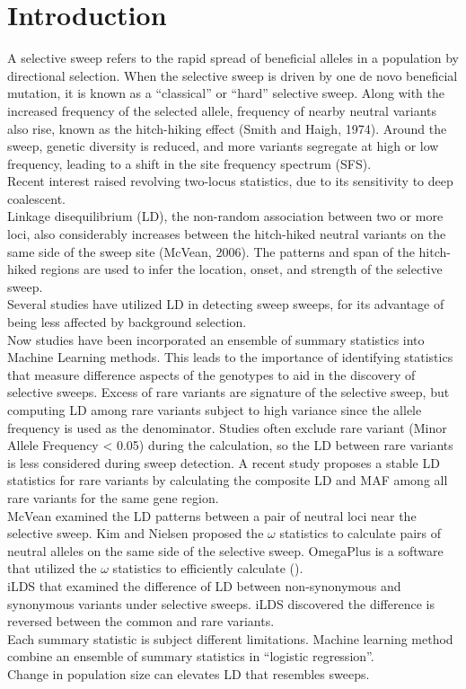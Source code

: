 \documentclass[12pt]{article}
\begin{document}
\section{Introduction}
A selective sweep refers to the rapid spread of beneficial alleles in a population by directional selection. When the selective sweep is driven by one de novo beneficial mutation, it is known as a “classical” or “hard” selective sweep. Along with the increased frequency of the selected allele, frequency of nearby neutral variants also rise, known as the hitch-hiking effect (Smith and Haigh, 1974). Around the sweep, genetic diversity is reduced, and more variants segregate at high or low frequency, leading to a shift in the site frequency spectrum (SFS). 
\\
Recent interest raised revolving two-locus statistics, due to its sensitivity to deep coalescent. 
\\
Linkage disequilibrium (LD), the non-random association between two or more loci, also considerably increases between the hitch-hiked neutral variants on the same side of the sweep site (McVean, 2006). The patterns and span of the hitch-hiked regions are used to infer the location, onset, and strength of the selective sweep. 
\\
Several studies have utilized LD in detecting sweep sweeps, for its advantage of being less affected by background selection.
\\
Now studies have been incorporated an ensemble of summary statistics into Machine Learning methods. This leads to the importance of identifying statistics that measure difference aspects of the genotypes to aid in the discovery of selective sweeps.
Excess of rare variants are signature of the selective sweep, but computing LD among rare variants subject to high variance since the allele frequency is used as the denominator. Studies often exclude rare variant (Minor Allele Frequency < 0.05) during the calculation, so the LD between rare variants is less considered during sweep detection. A recent study proposes a stable LD statistics for rare variants by calculating the composite LD and MAF among all rare variants for the same gene region. 
\\
McVean examined the LD patterns between a pair of neutral loci near the selective sweep. Kim and Nielsen proposed the $\omega$ statistics to calculate pairs of neutral alleles on the same side of the selective sweep. OmegaPlus is a software that utilized the $\omega$ statistics to efficiently calculate (). 
\\
iLDS that examined the difference of LD between non-synonymous and synonymous variants under selective sweeps. iLDS discovered the difference is reversed between the common and rare variants. 
\\
Each summary statistic is subject different limitations. Machine learning method combine an ensemble of summary statistics in “logistic regression”.
\\
Change in population size can elevates LD that resembles sweeps. 
\end{document}
